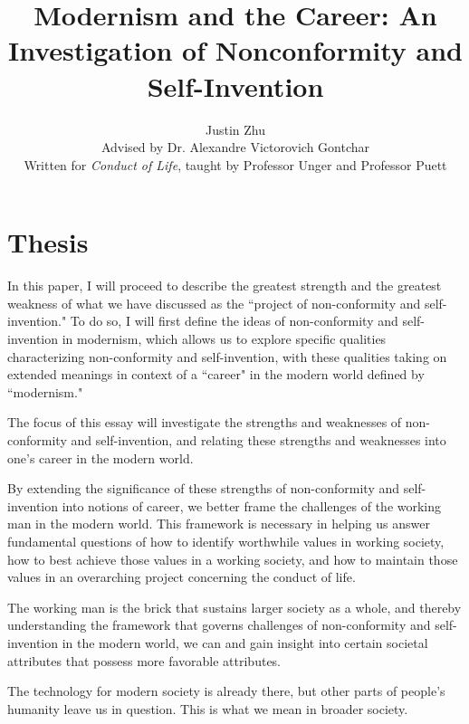 \documentclass[12pt,letterpaper]{article}
\author{Justin Zhu \\ Advised by Dr. Alexandre Victorovich Gontchar \\ Written for \textit{Conduct of Life}, taught by Professor Unger and Professor Puett}
\title{Modernism and the Career: An Investigation of Nonconformity and Self-Invention}
\date{}
\newif\ifdraft
\begin{document}
\clearpage\maketitle
\thispagestyle{empty}
\pagebreak
\tableofcontents

\pagebreak

\pagestyle{plain}
\setcounter{page}{1}


\section{Thesis}
In this paper, I will proceed to describe
the greatest strength and the greatest weakness of what we
have discussed as the ``project of non-conformity and
self-invention."  To do so, I will first define the ideas of
non-conformity and self-invention in modernism, which allows us to explore specific qualities characterizing
non-conformity and self-invention, with these qualities
taking on extended meanings in context of a ``career" in
the modern world defined by ``modernism."

The focus of this essay will investigate the strengths and weaknesses of non-conformity and self-invention, and relating these strengths and weaknesses into one's career in the modern world.
\ifdraft
We will trace the development of the typical adult's career starting in university, identifying forces that contribute to non-conformity and self-invention along every stage of a typical adult's career in the modern world.
\fi
By extending the significance of these
strengths of non-conformity and self-invention into
notions of career, we better frame the challenges of the working man in the modern world.  This framework is necessary in helping us answer fundamental questions of how to identify worthwhile values in working society, how to best achieve those values in a working society, and how to maintain those values in an overarching project concerning the conduct of life.

\ifdraft

The working man is the brick that sustains larger society as a whole, and thereby understanding
the framework that governs challenges of non-conformity and self-invention in the modern world, we can and gain insight into certain societal attributes that possess more favorable attributes.

The technology for modern society is already there, but other parts of people's humanity leave us in question.  This is what we mean in broader society. 
\end{document}
